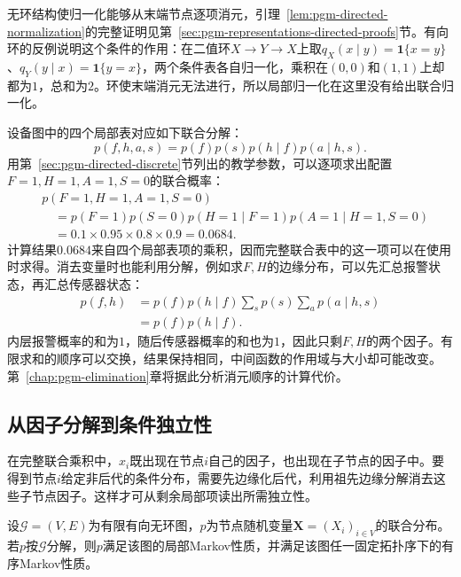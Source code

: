 无环结构使归一化能够从末端节点逐项消元，引理~\ref{lem:pgm-directed-normalization}的完整证明见第~\ref{sec:pgm-representations-directed-proofs}节。有向环的反例说明这个条件的作用：在二值环$X\to Y\to X$上取$q_X(x\mid y)=\mathbf{1}\{x=y\}$、$q_Y(y\mid x)=\mathbf{1}\{y=x\}$，两个条件表各自归一化，乘积在$(0,0)$和$(1,1)$上却都为$1$，总和为$2$。环使末端消元无法进行，所以局部归一化在这里没有给出联合归一化。

设备图中的四个局部表对应如下联合分解：
\begin{equation}
  p(f,h,a,s)=p(f)p(s)p(h\mid f)p(a\mid h,s).
  \label{eq:pgm-directed-device-factor}
\end{equation}
用第~\ref{sec:pgm-directed-discrete}节列出的教学参数，可以逐项求出配置$F=1,H=1,A=1,S=0$的联合概率：
\begin{equation}
  \begin{aligned}
    &p(F=1,H=1,A=1,S=0)\\
    &\quad=p(F=1)p(S=0)p(H=1\mid F=1)
      p(A=1\mid H=1,S=0)\\
    &\quad=0.1\times0.95\times0.8\times0.9
      =0.0684.
  \end{aligned}
  \label{eq:pgm-directed-device-configuration}
\end{equation}
计算结果$0.0684$来自四个局部表项的乘积，因而完整联合表中的这一项可以在使用时求得。消去变量时也能利用分解，例如求$F,H$的边缘分布，可以先汇总报警状态，再汇总传感器状态：
\[
  \begin{aligned}
    p(f,h)
    &=p(f)p(h\mid f)
      \sum_s p(s)\sum_a p(a\mid h,s)\\
    &=p(f)p(h\mid f).
  \end{aligned}
\]
内层报警概率的和为$1$，随后传感器概率的和也为$1$，因此只剩$F,H$的两个因子。有限求和的顺序可以交换，结果保持相同，中间函数的作用域与大小却可能改变。第~\ref{chap:pgm-elimination}章将据此分析消元顺序的计算代价。

\subsection{从因子分解到条件独立性}
\label{sec:pgm-directed-factor-to-ci}

在完整联合乘积中，$x_i$既出现在节点$i$自己的因子，也出现在子节点的因子中。要得到节点$i$给定非后代的条件分布，需要先边缘化后代，利用祖先边缘分解消去这些子节点因子。这样才可从剩余局部项读出所需独立性。

\begin{theorem}[分解蕴含局部与有序Markov性质]
  \label{thm:pgm-directed-factor-local}
  设$\mathcal{G}=(V,E)$为有限有向无环图，$p$为节点随机变量$\bm{X}=(X_i)_{i\in V}$的联合分布。若$p$按$\mathcal{G}$分解，则$p$满足该图的局部Markov性质，并满足该图任一固定拓扑序下的有序Markov性质。
\end{theorem}

